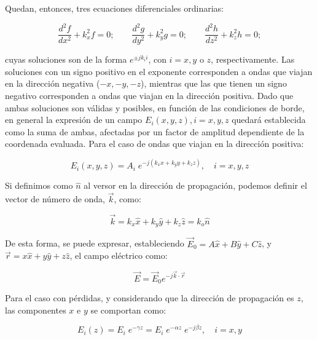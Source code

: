 Quedan, entonces, tres ecuaciones diferenciales ordinarias:

\begin{equation}
	\frac{d^2 f}{dx^2} + k_x^2 f = 0; \qquad \frac{d^2 g}{dy^2} + k_y^2 g = 0; \qquad \frac{d^2 h}{dz^2} + k_z^2 h = 0; \nonumber
\end{equation}

cuyas soluciones son de la forma $e^{\pm j k_i i}$, con $i = x, y$ o $z$, respectivamente. Las soluciones con un signo positivo en el exponente corresponden a ondas que viajan en la dirección negativa ($-x, -y, -z$), mientras que las que tienen un signo negativo corresponden a ondas que viajan en la dirección positiva. Dado que ambas soluciones son válidas y posibles, en función de las condiciones de borde, en general la expresión de un campo $E_i (x, y, z), i=x,y,z$ quedará establecida como la suma de ambas, afectadas por un factor de amplitud dependiente de la coordenada evaluada. Para el caso de ondas que viajan en la dirección positiva:

\begin{equation}
	E_i(x,y,z) = A_i \;e^{-j(k_x x + k_y y + k_z z)}, \quad i=x,y,z \nonumber
\end{equation}

Si definimos como $\hat{n}$ al versor en la dirección de propagación, podemos definir el vector de número de onda, $\vec{k}$, como:

\begin{equation}
	\label{eq:vector_numero_de_onda}
	\vec{k} = k_x \hat{x} + k_y \hat{y} + k_z \hat{z} = k_o \hat{n} \nonumber
\end{equation}

De esta forma, se puede expresar, estableciendo $\vec{E}_0 = A \hat{x} + B \hat{y} + C \hat{z}$, y $\vec{r} = x \hat{x} + y \hat{y} + z \hat{z}$, el campo eléctrico como:

\begin{equation}
	\label{eq:electric_field_wave_solution}
	\vec{E} = \vec{E}_0 e^{-j\vec{k} \cdot \vec{r}}
\end{equation}

Para el caso con pérdidas, y considerando que la dirección de propagación es $z$, las componentes $x$ e $y$ se comportan como:

\begin{equation}
E_i(z) = E_i \; e^{-\gamma z} = E_i \; e^{-\alpha z} \; e^{-j \beta z}, \quad i=x,y \nonumber
\end{equation}

